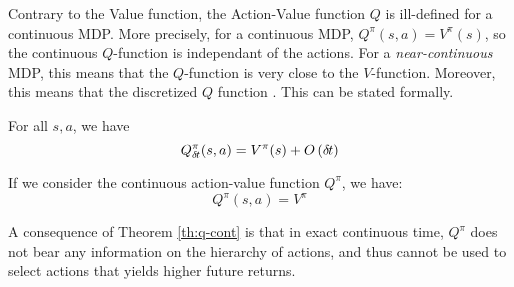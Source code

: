 Contrary to the Value function, the Action-Value function $Q$ is ill-defined
for a continuous MDP. More precisely, for a continuous MDP, $Q^\pi(s, a) =
V^\pi(s)$, so the continuous $Q$-function is independant of the actions. For a
\emph{near-continuous} MDP, this means that the $Q$-function is very close  to the
$V$-function. Moreover, this means that the discretized $Q$
function . This can be stated formally.
\begin{theorem}
  For all $s, a$, we have
  \begin{equation}
    \label{eq:q-discr}
    Q^\pi_{\delta\hspace{-.1em}t}(s, a) = V^\pi(s) + O\left({\delta\hspace{-.1em}t}\right)
  \end{equation}
  
  If we consider the continuous action-value function $Q^\pi$, we have:
  \begin{equation}
    \label{eq:q-cont}
    Q^\pi(s, a) = V^\pi
  \end{equation}
  \label{th:q-cont}
\end{theorem}

A consequence of Theorem \ref{th:q-cont} is that in exact continuous time,
$Q^\pi$ does not bear any information on the hierarchy of actions, and
thus cannot be used to select actions that yields higher future returns.

